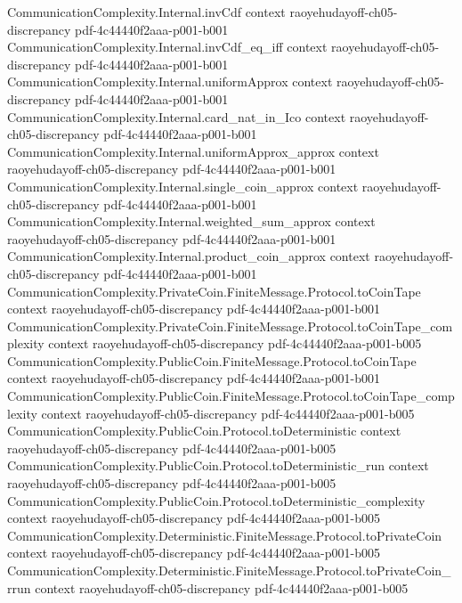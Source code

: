 \begin{theorem}
\proofstep
  {CommunicationComplexity.Internal.invCdf}
  {context}
  {raoyehudayoff-ch05-discrepancy}
  {pdf-4c44440f2aaa-p001-b001}
\proofstep
  {CommunicationComplexity.Internal.invCdf_eq_iff}
  {context}
  {raoyehudayoff-ch05-discrepancy}
  {pdf-4c44440f2aaa-p001-b001}
\proofstep
  {CommunicationComplexity.Internal.uniformApprox}
  {context}
  {raoyehudayoff-ch05-discrepancy}
  {pdf-4c44440f2aaa-p001-b001}
\proofstep
  {CommunicationComplexity.Internal.card_nat_in_Ico}
  {context}
  {raoyehudayoff-ch05-discrepancy}
  {pdf-4c44440f2aaa-p001-b001}
\proofstep
  {CommunicationComplexity.Internal.uniformApprox_approx}
  {context}
  {raoyehudayoff-ch05-discrepancy}
  {pdf-4c44440f2aaa-p001-b001}
\proofstep
  {CommunicationComplexity.Internal.single_coin_approx}
  {context}
  {raoyehudayoff-ch05-discrepancy}
  {pdf-4c44440f2aaa-p001-b001}
\proofstep
  {CommunicationComplexity.Internal.weighted_sum_approx}
  {context}
  {raoyehudayoff-ch05-discrepancy}
  {pdf-4c44440f2aaa-p001-b001}
\proofstep
  {CommunicationComplexity.Internal.product_coin_approx}
  {context}
  {raoyehudayoff-ch05-discrepancy}
  {pdf-4c44440f2aaa-p001-b001}
\proofstep
  {CommunicationComplexity.PrivateCoin.FiniteMessage.Protocol.toCoinTape}
  {context}
  {raoyehudayoff-ch05-discrepancy}
  {pdf-4c44440f2aaa-p001-b001}
\proofstep
  {CommunicationComplexity.PrivateCoin.FiniteMessage.Protocol.toCoinTape_complexity}
  {context}
  {raoyehudayoff-ch05-discrepancy}
  {pdf-4c44440f2aaa-p001-b005}
\proofstep
  {CommunicationComplexity.PublicCoin.FiniteMessage.Protocol.toCoinTape}
  {context}
  {raoyehudayoff-ch05-discrepancy}
  {pdf-4c44440f2aaa-p001-b001}
\proofstep
  {CommunicationComplexity.PublicCoin.FiniteMessage.Protocol.toCoinTape_complexity}
  {context}
  {raoyehudayoff-ch05-discrepancy}
  {pdf-4c44440f2aaa-p001-b005}
\proofstep
  {CommunicationComplexity.PublicCoin.Protocol.toDeterministic}
  {context}
  {raoyehudayoff-ch05-discrepancy}
  {pdf-4c44440f2aaa-p001-b005}
\proofstep
  {CommunicationComplexity.PublicCoin.Protocol.toDeterministic_run}
  {context}
  {raoyehudayoff-ch05-discrepancy}
  {pdf-4c44440f2aaa-p001-b005}
\proofstep
  {CommunicationComplexity.PublicCoin.Protocol.toDeterministic_complexity}
  {context}
  {raoyehudayoff-ch05-discrepancy}
  {pdf-4c44440f2aaa-p001-b005}
\proofstep
  {CommunicationComplexity.Deterministic.FiniteMessage.Protocol.toPrivateCoin}
  {context}
  {raoyehudayoff-ch05-discrepancy}
  {pdf-4c44440f2aaa-p001-b005}
\proofstep
  {CommunicationComplexity.Deterministic.FiniteMessage.Protocol.toPrivateCoin_rrun}
  {context}
  {raoyehudayoff-ch05-discrepancy}
  {pdf-4c44440f2aaa-p001-b005}

\end{theorem}
